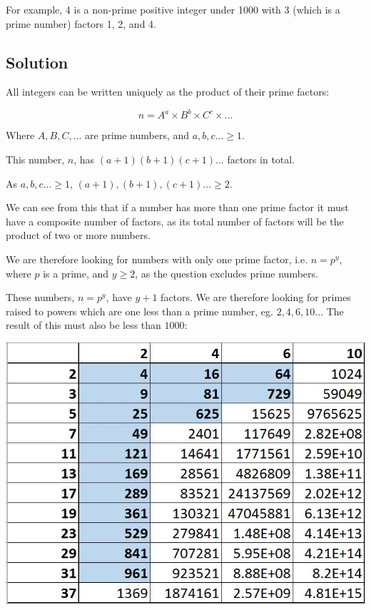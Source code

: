\documentclass{book}
\begin{document}
For example, 4 is a non-prime positive integer under 1000 with 3 (which is a prime number) factors 1, 2, and 4.

\subsection{Solution}
All integers can be written uniquely as the product of their prime factors:

\[n=A^a \times B^b \times C^c \times ...\]

Where \(A,B,C,...\) are prime numbers, and \(a,b,c...\geq 1\).

This number, \(n\), has \((a+1)(b+1)(c+1)...\) factors in total.

As \(a,b,c...\geq 1\), \((a+1),(b+1),(c+1)...\geq 2\).

We can see from this that if a number has more than one prime factor it must have a composite number of factors, as its total number of factors will be the product of two or more numbers.

We are therefore looking for numbers with only one prime factor, i.e. \(n=p^y\), where \(p\) is a prime, and \(y \geq 2\), as the question excludes prime numbers.

These numbers, \(n=p^y\), have \(y+1\) factors.
\newpage
We are therefore looking for primes raised to powers which are one less than a prime number, eg. \(2,4,6,10..\).  The result of this must also be less than \(1000\):

\begin{center}
\includegraphics{prime}
\end{center}
\end{document}
